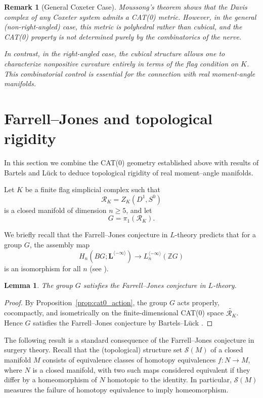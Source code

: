 \documentclass[11pt,a4paper]{article}
\numberwithin{equation}{section}
\newtheorem{remark}[definition]{Remark}
\newtheorem{lemma}[definition]{Lemma}
\theoremstyle{named}
\begin{document}
\begin{remark}[General Coxeter Case]
Moussong's theorem \cite{moussong} shows that the Davis complex of any Coxeter system admits a CAT(0) metric. However, in the general (non-right-angled) case, this metric is polyhedral rather than cubical, and the CAT(0) property is not determined purely by the combinatorics of the nerve.

In contrast, in the right-angled case, the cubical structure allows one to characterize nonpositive curvature entirely in terms of the flag condition on $K$. This combinatorial control is essential for the connection with real moment-angle manifolds.
\end{remark}


\section{Farrell--Jones and topological rigidity}
\label{sec:FJ}

In this section we combine the CAT(0) geometry established above with results of Bartels and L\"uck \cite{BartelsLuck2012} to deduce topological rigidity of real moment--angle manifolds.

\medskip

Let $K$ be a finite flag simplicial complex such that
\[
\mathcal{R}_K = Z_K(D^1,S^0)
\]
is a closed manifold of dimension $n \geq 5$, and let
\[
G = \pi_1(\mathcal{R}_K).
\]

We briefly recall that the Farrell--Jones conjecture in $L$-theory predicts that for a group $G$, the assembly map
\[
H_n(BG;\mathbf{L}^{\langle -\infty \rangle})
\longrightarrow
L_n^{\langle -\infty \rangle}(\mathbb{Z}G)
\]
is an isomorphism for all $n$ (see \cite{lr05}).

\begin{lemma}
\label{lem:FJ_CAT0}
The group $G$ satisfies the Farrell--Jones conjecture in $L$-theory.
\end{lemma}

\begin{proof}
By Proposition~\ref{prop:cat0_action}, the group $G$ acts properly, cocompactly, and isometrically on the finite-dimensional CAT(0) space $\widetilde{\mathcal{R}_K}$. Hence $G$ satisfies the Farrell--Jones conjecture by Bartels--L\"uck \cite{BartelsLuck2012}.
\end{proof}

\medskip

The following result is a standard consequence of the Farrell--Jones conjecture in surgery theory. Recall that the (topological) structure set $\mathcal{S}(M)$ of a closed manifold $M$ consists of equivalence classes of homotopy equivalences $f \colon N \to M$, where $N$ is a closed manifold, with two such maps considered equivalent if they differ by a homeomorphism of $N$ homotopic to the identity. In particular, $\mathcal{S}(M)$ measures the failure of homotopy equivalence to imply homeomorphism.
\end{document}
